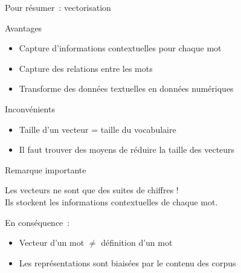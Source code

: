 \documentclass[serif, aspectratio=169]{beamer}
\begin{document}
\begin{frame}{Pour résumer~: vectorisation}
    \begin{block}{Avantages}
        \begin{itemize}
            \item Capture d'informations contextuelles pour chaque mot
            \item Capture des relations entre les mots
            \item Transforme des données textuelles en données numériques
        \end{itemize}
    \end{block}
    \vfill
    \begin{block}{Inconvénients}
        \begin{itemize}
            \item Taille d'un vecteur = taille du vocabulaire
            \item Il faut trouver des moyens de réduire la taille des vecteurs
        \end{itemize}
    \end{block}
\end{frame}

\begin{exoframe}{Remarque importante}
    \begin{center}
        \Large
        Les vecteurs ne sont que des suites de chiffres ! \\
        Ils stockent les informations contextuelles de chaque mot.
    \end{center}
    \vfill
    \begin{block}{En conséquence~:}
        \begin{itemize} \color{white}
            \item Vecteur d'un mot $\ne$ définition d'un mot
            \item Les représentations sont biaisées par le contenu des corpus
        \end{itemize}
    \end{block}
\end{exoframe}
\end{document}

